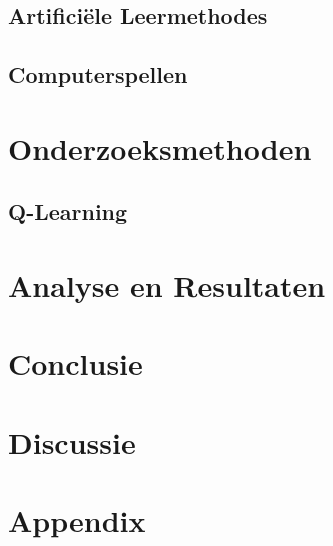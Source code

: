 \documentclass[a4paper,12pt]{report}
\begin{document}
\section{Artificiële Leermethodes}

\section{Computerspellen}

\chapter{Onderzoeksmethoden}
\section{Q-Learning}

\chapter{Analyse en Resultaten}

\chapter{Conclusie}

\chapter{Discussie}

\chapter*{Appendix}

\printbibliography
{}
\end{document}
